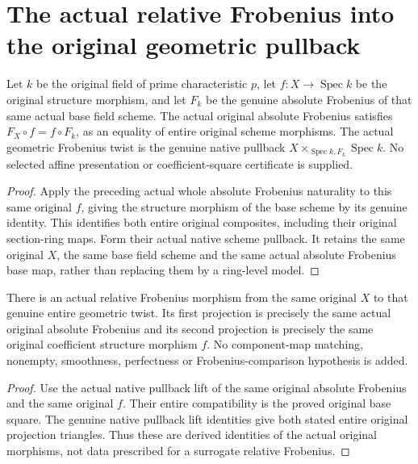 \section{The actual relative Frobenius into the original geometric pullback}
\label{sec:scheme-relative-frobenius}

\begin{theorem}
\label{lem:cartier-original-scheme-frobenius-base-square}
\leanok
Let $k$ be the original field of prime characteristic $p$, let
$f:X\to\operatorname{Spec}k$ be the original structure morphism,
and let $F_k$ be the genuine absolute Frobenius of that same actual
base field scheme. The actual original absolute Frobenius satisfies
$F_X\circ f=f\circ F_k$, as an equality of entire original scheme
morphisms. The actual geometric Frobenius twist is the genuine
native pullback $X\times_{\operatorname{Spec}k,F_k}\operatorname{Spec}k$.
No selected affine presentation or coefficient-square certificate
is supplied.
\end{theorem}
\begin{proof}
Apply the preceding actual whole absolute Frobenius naturality to
this same original $f$, giving the structure morphism of the base
scheme by its genuine identity. This identifies both entire
original composites, including their original section-ring maps.
Form their actual native scheme pullback. It retains the same
original $X$, the same base field scheme and the same actual
absolute Frobenius base map, rather than replacing them by a
ring-level model.
\end{proof}

\begin{theorem}
\label{thm:cartier-original-entire-scheme-relative-frobenius}
\leanok
There is an actual relative Frobenius morphism from the same
original $X$ to that genuine entire geometric twist. Its first
projection is precisely the same actual original absolute
Frobenius and its second projection is precisely the same original
coefficient structure morphism $f$. No component-map matching,
nonempty, smoothness, perfectness or Frobenius-comparison hypothesis
is added.
\end{theorem}
\begin{proof}
Use the actual native pullback lift of the same original absolute
Frobenius and the same original $f$. Their entire compatibility is
the proved original base square. The genuine native pullback lift
identities give both stated entire original projection triangles.
Thus these are derived identities of the actual original morphisms,
not data prescribed for a surrogate relative Frobenius.
\end{proof}

